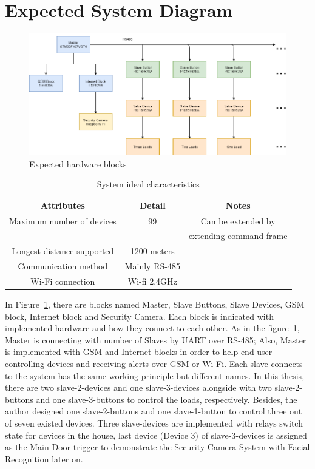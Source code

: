 \section{Expected System Diagram}
\begin{figure}[!ht]
    \includegraphics[scale=0.5]{images/hardwareBlock.png}
    \caption{Expected hardware blocks}
    \label{fig:hardwareBlock}
\end{figure}

    \begin{table}[h!]
    \begin{center}
    \begin{tabular}{ |c|c|c|  }
      \hline
      Attributes & Detail & Notes\\
      \hline
      Maximum number of devices&   99& Can be extended by\\
      & &extending command frame\\
      \hline
      Longest distance supported&   1200 meters&\\
      \hline
      Communication method &Mainly RS-485&\\
      \hline
      Wi-Fi connection & Wi-fi 2.4GHz&\\
      \hline
     \end{tabular}
     \caption{System ideal characteristics}
     \label{table:idealCharacteristics}
    \end{center}
    \end{table}
    In Figure~\ref{fig:hardwareBlock}, there are blocks named Master, Slave Buttons, Slave Devices, GSM block, Internet block and Security Camera. Each block is indicated with implemented hardware and how they connect to each other. As in the figure~\ref{fig:hardwareBlock}, Master is connecting with number of Slaves by UART over RS-485; Also, Master is implemented with GSM and Internet blocks in order to help end user controlling devices and receiving alerts over GSM or Wi-Fi. Each slave connects to the system has the same working principle but different names. In this thesis, there are two slave-2-devices and one slave-3-devices alongside with two slave-2-buttons and one slave-3-buttons to control the loads, respectively. Besides, the author designed one slave-2-buttons and one slave-1-button to control three out of seven existed devices. Three slave-devices are implemented with relays switch state for devices in the house, last device (Device 3) of slave-3-devices is assigned as the Main Door trigger to demonstrate the Security Camera System with Facial Recognition later on.

